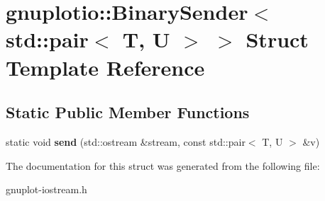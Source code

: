 \hypertarget{structgnuplotio_1_1BinarySender_3_01std_1_1pair_3_01T_00_01U_01_4_01_4}{}\section{gnuplotio\+:\+:Binary\+Sender$<$ std\+:\+:pair$<$ T, U $>$ $>$ Struct Template Reference}
\label{structgnuplotio_1_1BinarySender_3_01std_1_1pair_3_01T_00_01U_01_4_01_4}
\subsection*{Static Public Member Functions}
\begin{DoxyCompactItemize}
\item 
\mbox{\label{structgnuplotio_1_1BinarySender_3_01std_1_1pair_3_01T_00_01U_01_4_01_4_a9d949c8e7b1dea493288b0a2dd95cbff}} 
static void {\bfseries send} (std\+::ostream \&stream, const std\+::pair$<$ T, U $>$ \&v)
\end{DoxyCompactItemize}


The documentation for this struct was generated from the following file\+:\begin{DoxyCompactItemize}
\item 
gnuplot-\/iostream.\+h\end{DoxyCompactItemize}
